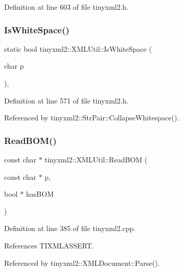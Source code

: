 Definition at line 603 of file tinyxml2.\+h.

\mbox{\label{classtinyxml2_1_1_x_m_l_util_a357ec3af8fc433d19023a815f45e8e33}} 
\subsubsection{Is\+White\+Space()}
{\footnotesize\ttfamily static bool tinyxml2\+::\+X\+M\+L\+Util\+::\+Is\+White\+Space (\begin{DoxyParamCaption}\item[{char}]{p }\end{DoxyParamCaption})\hspace{0.3cm}{\ttfamily [inline]}, {\ttfamily [static]}}



Definition at line 571 of file tinyxml2.\+h.



Referenced by tinyxml2\+::\+Str\+Pair\+::\+Collapse\+Whitespace().

\mbox{\label{classtinyxml2_1_1_x_m_l_util_ae9bcb2bc3cd6475fdc644c8c17790555}} 
\subsubsection{Read\+B\+O\+M()}
{\footnotesize\ttfamily const char $\ast$ tinyxml2\+::\+X\+M\+L\+Util\+::\+Read\+B\+OM (\begin{DoxyParamCaption}\item[{const char $\ast$}]{p,  }\item[{bool $\ast$}]{has\+B\+OM }\end{DoxyParamCaption})\hspace{0.3cm}{\ttfamily [static]}}



Definition at line 385 of file tinyxml2.\+cpp.



References T\+I\+X\+M\+L\+A\+S\+S\+E\+RT.



Referenced by tinyxml2\+::\+X\+M\+L\+Document\+::\+Parse().

\mbox{\label{classtinyxml2_1_1_x_m_l_util_af98a6a80dbeec4679366c1aba4c5b747}} 
